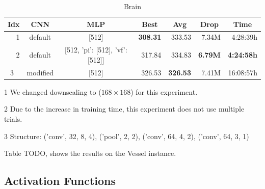 \begin{table}[htp]
    \begin{center}
        \begin{threeparttable}
            \begin{tabular}{rccrrrr}
                \toprule
                \multicolumn{1}{c}{Idx} & \multicolumn{1}{c}{CNN} & \multicolumn{1}{c}{MLP} & \multicolumn{1}{c}{Best} & \multicolumn{1}{c}{Avg} & \multicolumn{1}{c}{Drop} & \multicolumn{1}{c}{Time}\\
                \midrule
                1 & default & [512] & \textbf{308.31} & 333.53 & 7.34M & 4:28:39h \\
                2 & default & [512, {'pi': [512], 'vf': [512]}] & 317.84 & 334.83 & \textbf{6.79M} & \textbf{4:24:58h} \\
                3\tnote{1} \ \tnote{2} & modified\tnote{3} & [512] & 326.53 & \textbf{326.53}\tnote{2} & 7.41M & 16:08:57h \\
                \bottomrule
            \end{tabular}
            \begin{tablenotes} \footnotesize
                \item[1] We changed downscaling to ($168 \times 168$) for this experiment.
                \item[2] Due to the increase in training time, this experiment does not use multiple trials. 
                \item[3] Structure: ('conv', 32, 8, 4), ('pool', 2, 2), ('conv', 64, 4, 2), ('conv', 64, 3, 1)
            \end{tablenotes}
        \end{threeparttable}
    \end{center}
    \caption{Brain}
\end{table}

Table TODO, shows the results on the Vessel instance.


\subsection{Activation Functions} \label{sec:Eval/ActivationFunctions}

